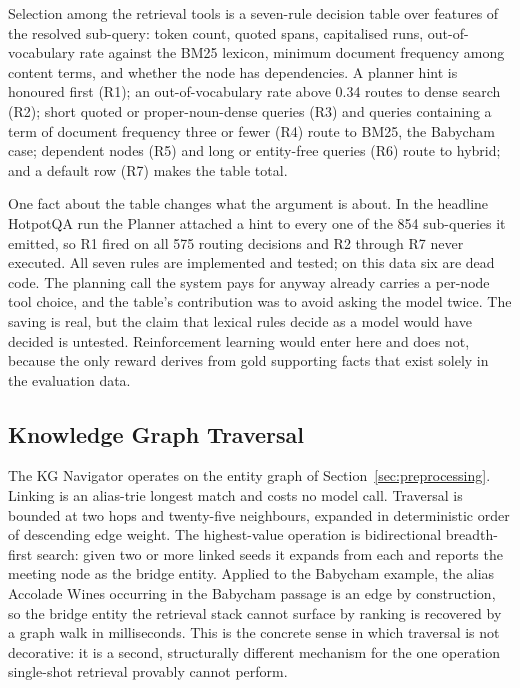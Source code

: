 Selection among the retrieval tools is a seven-rule decision table over
features of the resolved sub-query: token count, quoted spans, capitalised
runs, out-of-vocabulary rate against the BM25 lexicon, minimum document
frequency among content terms, and whether the node has dependencies. A
planner hint is honoured first (R1); an out-of-vocabulary rate above 0.34
routes to dense search (R2); short quoted or proper-noun-dense queries (R3) and
queries containing a term of document frequency three or fewer (R4) route to
BM25, the Babycham case; dependent nodes (R5) and long or entity-free queries
(R6) route to hybrid; and a default row (R7) makes the table total.

One fact about the table changes what the argument is about. In the headline
HotpotQA run the Planner attached a hint to every one of the 854 sub-queries it
emitted, so R1 fired on all 575 routing decisions and R2 through R7 never
executed. All seven rules are implemented and tested; on this data six are
dead code. The planning call the system pays for anyway already carries a
per-node tool choice, and the table's contribution was to avoid asking the
model twice. The saving is real, but the claim that lexical rules decide as a
model would have decided is untested. Reinforcement learning would enter here
and does not, because the only reward derives from gold supporting facts that
exist solely in the evaluation data.

\subsection{Knowledge Graph Traversal}
\label{sec:kg-traversal}

The KG Navigator operates on the entity graph of
Section~\ref{sec:preprocessing}. Linking is an alias-trie longest match and
costs no model call. Traversal is bounded at two hops and twenty-five
neighbours, expanded in deterministic order of descending edge weight. The
highest-value operation is bidirectional breadth-first search: given two or
more linked seeds it expands from each and reports the meeting node as the
bridge entity. Applied to the Babycham example, the alias Accolade Wines
occurring in the Babycham passage is an edge by construction, so the bridge
entity the retrieval stack cannot surface by ranking is recovered by a graph
walk in milliseconds. This is the concrete sense in which traversal is not
decorative: it is a second, structurally different mechanism for the one
operation single-shot retrieval provably cannot perform.

